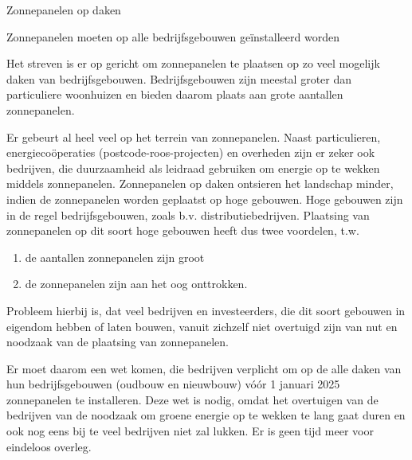 \begin{voorstel}{Zonnepanelen op daken}

\begin{samenvatting}
Zonnepanelen moeten op alle bedrijfsgebouwen geïnstalleerd worden
\end{samenvatting}

\begin{uitdaging}
Het streven is er op gericht om zonnepanelen te plaatsen op zo veel mogelijk daken van bedrijfsgebouwen. Bedrijfsgebouwen zijn meestal groter dan particuliere woonhuizen en bieden daarom plaats aan grote aantallen zonnepanelen.
\end{uitdaging}

\begin{overwegingen}
Er gebeurt al heel veel op het terrein van zonnepanelen. Naast particulieren, energiecoöperaties (postcode-roos-projecten) en overheden zijn er zeker ook bedrijven, die duurzaamheid als leidraad gebruiken om energie op te wekken middels zonnepanelen. Zonnepanelen op daken ontsieren het landschap minder, indien de zonnepanelen worden geplaatst op hoge gebouwen. Hoge gebouwen zijn in de regel bedrijfsgebouwen, zoals b.v. distributiebedrijven. Plaatsing van zonnepanelen op dit soort hoge gebouwen heeft dus twee voordelen, t.w.

\begin{enumerate}
	\item de aantallen zonnepanelen zijn groot
	\item de zonnepanelen zijn aan het oog onttrokken.
\end{enumerate}

Probleem hierbij is, dat veel bedrijven en investeerders, die dit soort gebouwen in eigendom hebben of laten bouwen, vanuit zichzelf niet overtuigd zijn van nut en noodzaak van de plaatsing van zonnepanelen.
\end{overwegingen}

\begin{aanbevelingen}
Er moet daarom een wet komen, die bedrijven verplicht om op de alle daken van hun bedrijfsgebouwen (oudbouw en nieuwbouw) vóór 1 januari 2025 zonnepanelen te installeren. Deze wet is nodig, omdat het overtuigen van de bedrijven van de noodzaak om groene energie op te wekken te lang gaat duren en ook nog eens bij te veel bedrijven niet zal lukken. Er is geen tijd meer voor eindeloos overleg.
\end{aanbevelingen}

\end{voorstel}
